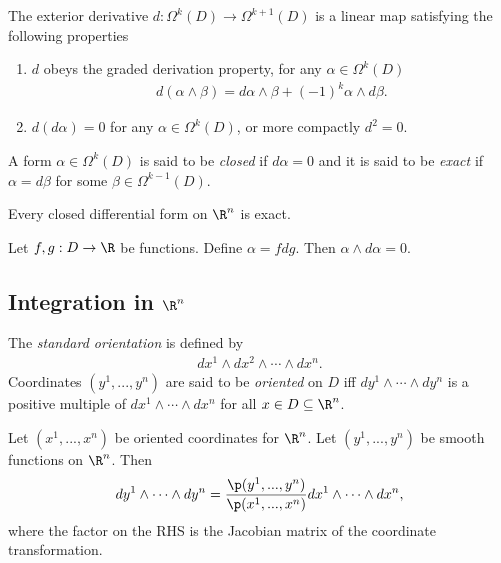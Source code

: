 \documentclass{article}
\begin{document}
\begin{theorem}
	The exterior derivative $d:\Omega^k(D)\to \Omega^{k+1}(D)$ is a linear map satisfying
	the following properties
	\begin{enumerate}
		\item $d$ obeys the graded derivation property, for any $\alpha\in\Omega^k(D)$ \begin{align*}
			      d(\alpha \wedge \beta) = d\alpha\wedge\beta +(-1)^k\alpha\wedge d\beta.
		      \end{align*}
		\item $d(d\alpha)=0$ for any $\alpha\in\Omega^k(D)$, or more compactly $d^2=0$.
	\end{enumerate}
\end{theorem}

\begin{definition}
	A form $\alpha\in\Omega^k(D)$ is said to be \emph{closed} if $d\alpha = 0$ and it is said
	to be \emph{exact} if $\alpha=d\beta$ for some $\beta\in\Omega^{k-1} (D)$.
\end{definition}

\begin{lemma}[Poincar\'e]
	Every closed differential form on $\R^n$ is exact.
\end{lemma}

\begin{lemma}
	Let $f,g:D\to\R$ be functions. Define $\alpha=fdg$. Then $\alpha\wedge d\alpha=0$.
\end{lemma}

\subsection{Integration in $\R^n$}

\begin{definition}
	The \emph{standard orientation} is defined by
	\begin{align*}
		dx^1\wedge dx^2 \wedge \cdots \wedge dx^n.
	\end{align*}
	Coordinates $(y^1, ..., y^n)$ are said to be \emph{oriented} on $D$ iff
	$dy^1\wedge\cdots\wedge dy^n$ is a positive multiple of $dx^1\wedge\cdots\wedge dx^n$
	for all $x\in D\subseteq \R^n$.
\end{definition}

\begin{proposition}
	Let $(x^1,...,x^n)$ be oriented coordinates for $\R^n$. Let $(y^1, ..., y^n)$ be
	smooth functions on $\R^n$. Then
	\begin{align*}
		dy^1\wedge\cdots\wedge dy^n = \frac{\p(y^1,...,y^n)}{\p(x^1,...,x^n)}dx^1\wedge\cdots\wedge dx^n,
	\end{align*}
	where the factor on the RHS is the Jacobian matrix of the coordinate transformation.
\end{proposition}
\end{document}
